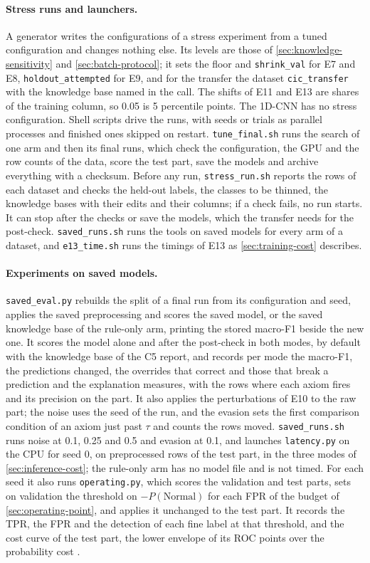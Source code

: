 \paragraph{Stress runs and launchers.}
A generator writes the configurations of a stress experiment from a tuned configuration and
changes nothing else. Its levels are those of \cref{sec:knowledge-sensitivity} and
\cref{sec:batch-protocol}; it sets the floor and \texttt{shrink\_val} for E7 and E8,
\texttt{holdout\_attempted} for E9, and for the transfer the dataset \texttt{cic\_transfer} with
the knowledge base named in the call. The shifts of E11 and E13 are shares of the training
column, so 0.05 is 5 percentile points. The 1D-CNN has no stress configuration. Shell scripts
drive the runs, with seeds or trials as parallel processes and finished ones skipped on restart.
\texttt{tune\_final.sh} runs the search of one arm and then its final runs, which check the
configuration, the GPU and the row counts of the data, score the test part, save the models and
archive everything with a checksum. Before any run, \texttt{stress\_run.sh} reports the rows of
each dataset and checks the held-out labels, the classes to be thinned, the knowledge bases with
their edits and their columns; if a check fails, no run starts. It can stop after the checks or
save the models, which the transfer needs for the post-check. \texttt{saved\_runs.sh} runs the
tools on saved models for every arm of a dataset, and \texttt{e13\_time.sh} runs the timings of
E13 as \cref{sec:training-cost} describes.

\paragraph{Experiments on saved models.}
\texttt{saved\_eval.py} rebuilds the split of a final run from its configuration and seed,
applies the saved preprocessing and scores the saved model, or the saved knowledge base of the
rule-only arm, printing the stored macro-F1 beside the new one. It scores the model alone and
after the post-check in both modes, by default with the knowledge base of the C5 report, and
records per mode the macro-F1, the predictions changed, the overrides that correct and those that
break a prediction and the explanation measures, with the rows where each axiom fires and its
precision on the part. It also applies the perturbations of E10 to the raw part; the noise uses
the seed of the run, and the evasion sets the first comparison condition of an axiom just past
$\tau$ and counts the rows moved. \texttt{saved\_runs.sh} runs noise at 0.1, 0.25 and 0.5 and
evasion at 0.1, and launches \texttt{latency.py} on the CPU for seed 0, on preprocessed rows of
the test part, in the three modes of \cref{sec:inference-cost}; the rule-only arm has no model file
and is not timed. For each seed it also runs \texttt{operating.py}, which scores the validation and
test parts, sets on validation the threshold on $-P(\text{Normal})$ for each FPR of the budget of
\cref{sec:operating-point}, and applies it unchanged to the test part. It records the TPR, the FPR and
the detection of each fine label at that threshold, and the cost curve of the test part, the lower
envelope of its ROC points over the probability cost \citep{drummond2006cost}.

